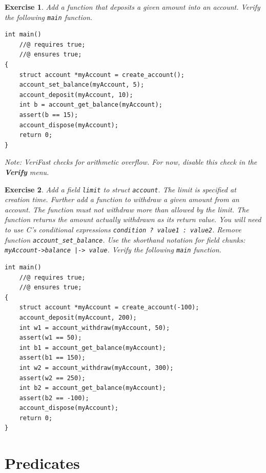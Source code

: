 \documentclass{article}
\newtheorem{exercise}{Exercise}
\begin{document}
\begin{exercise}\label{exercise:account2}
Add a function that deposits a given amount into an account.
Verify the following \lstinline!main! function.
\begin{lstlisting}
int main()
    //@ requires true;
    //@ ensures true;
{
    struct account *myAccount = create_account();
    account_set_balance(myAccount, 5);
    account_deposit(myAccount, 10);
    int b = account_get_balance(myAccount);
    assert(b == 15);
    account_dispose(myAccount);
    return 0;
}
\end{lstlisting}
Note: VeriFast checks for arithmetic overflow. For now, disable
this check in the \textbf{Verify} menu.
\end{exercise}

\begin{exercise}\label{exercise:account3}
Add a field \lstinline!limit! to struct \lstinline!account!.
The limit is specified at creation time. Further add a function
to withdraw a given amount from an account. The function must
not withdraw more than allowed by the limit. The function
returns the amount actually withdrawn as its return value. You
will need to use C's conditional expressions
\lstinline!condition ? value1 : value2!. Remove function
\lstinline!account_set_balance!. Use the shorthand notation for
field chunks: \lstinline!myAccount->balance |-> value!. Verify
the following \lstinline!main! function.
\begin{lstlisting}
int main()
    //@ requires true;
    //@ ensures true;
{
    struct account *myAccount = create_account(-100);
    account_deposit(myAccount, 200);
    int w1 = account_withdraw(myAccount, 50);
    assert(w1 == 50);
    int b1 = account_get_balance(myAccount);
    assert(b1 == 150);
    int w2 = account_withdraw(myAccount, 300);
    assert(w2 == 250);
    int b2 = account_get_balance(myAccount);
    assert(b2 == -100);
    account_dispose(myAccount);
    return 0;
}
\end{lstlisting}
\end{exercise}

\section{Predicates}
\end{document}
